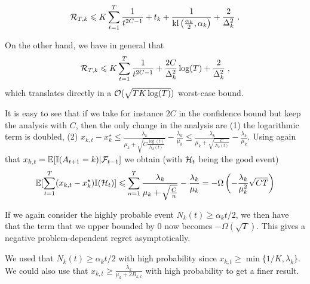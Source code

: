 \[\mathcal{R}_{T,k}\leqslant K \sum_{t=1}^T \frac{1}{t^{2C-1}} + t_k + \frac{1}{\text{\normalfont kl}\left(\frac{\alpha_k}{2}, \alpha_k\right)} + \frac{2}{\Delta_k^2} \;.\]

On the other hand, we have in general that
\[\mathcal{R}_{T,k}\leqslant K \sum_{t=1}^T \frac{1}{t^{2C-1}} + \frac{2C}{\Delta_k^2} \log(T) + \frac{2}{\Delta_k^2} \;,  \]
which translates directly in a $\mathcal{O}(\sqrt{TK\log(T)})$ worst-case bound.

\begin{remark} 
	
It is easy to see that if we take for instance $2C$ in the confidence bound but keep the analysis with $C$, then the only change in the analysis are (1) the logarithmic term is doubled, (2) $x_{k, t}-x_k^\star\leq \frac{\lambda_k}{\mu_k+\sqrt{C\frac{\log(t)}{N_k(t)}}}-\frac{\lambda_k}{\mu_k}\leq \frac{\lambda_k}{\mu_k+\sqrt{\frac{C}{N_k(t)}}}-\frac{\lambda_k}{\mu_k}$. Using again that $x_{k,t}=\mathbb{E}[\mathbb{I}(A_{t+1}=k)|\mathcal{F}_{t-1}]$ we obtain (with $\mathcal{H}_t$ being the good event)
\[\mathbb{E}[\sum_{t=1}^T(x_{k,t}-x_k^\star)\mathbb{I}(\mathcal{H}_t)] \leqslant \sum_{n=1}^T \frac{\lambda_k}{\mu_k+\sqrt{\frac{C}{n}}}-\frac{\lambda_k}{\mu_k} = -\Omega\left(-\frac{\lambda_k}{\mu_k^2}\sqrt{CT}\right)
\]

If we again consider the highly probable event $N_k(t)\geq \alpha_k t/2$, we then have that the term that we upper bounded by $0$ now becomes $-\Omega(\sqrt{T})$. This gives a negative problem-dependent regret asymptotically.
\end{remark}


\begin{remark} 
	We used that $N_k(t)\geq \alpha_k t/2$ with high probability since $x_{k, t}\geq \min\{1/K, \lambda_k \}$. We could also use that $x_{k, t}\geq \frac{\lambda_k}{\mu_k+ 2 B_{k, t}}$ with high probability to get a finer result.
\end{remark}